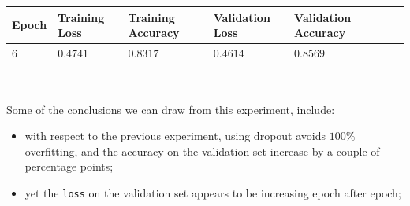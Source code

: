 \documentclass[11pt,a4paper]{article}
\begin{document}
\begin{center}
\begin{tabular}{|p{1.2cm}|p{1.8cm}|p{2cm}|p{2cm}|p{2cm}|p{2cm}|p{2cm}|}
\rowcolor{gray!50}
\hline
\textbf{Epoch} & \textbf{Training Loss} & \textbf{Training Accuracy} & \textbf{Validation Loss} & \textbf{Validation Accuracy}\\
\hline
$6$ & $0.4741$ & $0.8317$ & $0.4614$ & $0.8569$\\
\hline
\end{tabular}\\
\end{center}
Some of the conclusions we can draw from this experiment, include:
\begin{itemize}
    \item with respect to the previous experiment, using dropout avoids $100\%$ overfitting, and the accuracy on the validation set increase by a couple of percentage points;
    \item yet the \texttt{loss} on the validation set appears to be increasing epoch after epoch;
\end{itemize}
\end{document}
